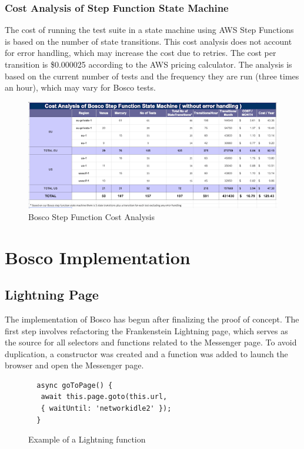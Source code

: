 \documentclass[12pt,a4paper,titlepage]{report}
\begin{document}
\subsection{Cost Analysis of Step Function State Machine}

The cost of running the test suite in a state machine using AWS Step Functions is based on the number of state transitions. This cost analysis does not account for error handling, which may increase the cost due to retries. The cost per transition is \$0.000025 according to the AWS pricing calculator. The analysis is based on the current number of tests and the frequency they are run (three times an hour), which may vary for Bosco tests.

\begin{figure}[h]
  \centering
  \includegraphics[width=15cm]{./diagrams/sf_cost_analysis}
  \caption{Bosco Step Function Cost Analysis}
\end{figure}

\chapter{Bosco Implementation}

\section{Lightning Page}
The implementation of Bosco has begun after finalizing the proof of concept. The first step involves refactoring the Frankenstein Lightning page, which serves as the source for all selectors and functions related to the Messenger page. To avoid duplication, a constructor was created and a function was added to launch the browser and open the Messenger page.

\begin{figure}[H]
  \begin{tcolorbox}
    \begin{verbatim}
  async goToPage() {
   await this.page.goto(this.url, 
   { waitUntil: 'networkidle2' });
  }
\end{verbatim}
  \end{tcolorbox}
  \caption{Example of a Lightning function}
\end{figure}
\end{document}
